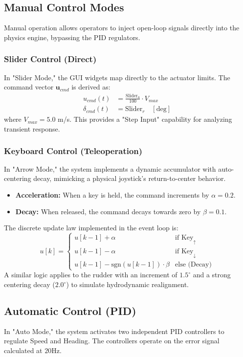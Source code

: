 \documentclass[12pt, a4paper, oneside]{report}
\begin{document}
\subsection{Manual Control Modes}
Manual operation allows operators to inject open-loop signals directly into the physics engine, bypassing the PID regulators.

\subsubsection{Slider Control (Direct)}
In "Slider Mode," the GUI widgets map directly to the actuator limits. The command vector $\mathbf{u}_{cmd}$ is derived as:
\begin{align}
    u_{cmd}(t) &= \frac{\text{Slider}_u}{100} \cdot V_{max} \\
    \delta_{cmd}(t) &= \text{Slider}_r \quad [\text{deg}]
\end{align}
where $V_{max} = 5.0$ m/s. This provides a "Step Input" capability for analyzing transient response.

\subsubsection{Keyboard Control (Teleoperation)}
In "Arrow Mode," the system implements a dynamic accumulator with auto-centering decay, mimicking a physical joystick's return-to-center behavior.
\begin{itemize}
    \item \textbf{Acceleration:} When a key is held, the command increments by $\alpha = 0.2$.
    \item \textbf{Decay:} When released, the command decays towards zero by $\beta = 0.1$.
\end{itemize}
The discrete update law implemented in the event loop is:
\begin{equation}
    u[k] = \begin{cases} 
    u[k-1] + \alpha & \text{if Key}_{\uparrow} \\
    u[k-1] - \alpha & \text{if Key}_{\downarrow} \\
    u[k-1] - \text{sgn}(u[k-1]) \cdot \beta & \text{else (Decay)}
    \end{cases}
\end{equation}
A similar logic applies to the rudder with an increment of $1.5^\circ$ and a strong centering decay ($2.0^\circ$) to simulate hydrodynamic realignment.

\subsection{Automatic Control (PID)}
In "Auto Mode," the system activates two independent PID controllers to regulate Speed and Heading. The controllers operate on the error signal calculated at $20\text{Hz}$.
\end{document}
